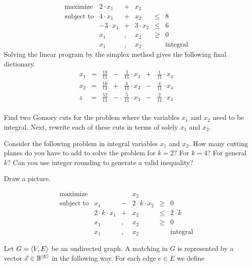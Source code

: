 {\begin{exercise}
\begin{equation}
\begin{array}{rrcrcr}
\mbox{maximize}&2\cdot x_1&+&x_2\\
\mbox{subject to}&4\cdot x_1&+&x_2&\leq&8\\
&-3\cdot x_1&+&3\cdot x_2&\leq&6\\
&x_1&,&x_2&\geq&0\\
&x_1&,&x_2&&\mbox{integral}
\end{array}
\end{equation}
Solving the linear program by the simplex method gives the following final dictionary.
\begin{equation}
\begin{array}{rcrcrcr}
x_1&=&\tfrac{18}{11}&-&\tfrac{3}{11}\cdot x_3&+&\tfrac{1}{11}\cdot x_4\\
x_2&=&\tfrac{16}{11}&+&\tfrac{1}{11}\cdot x_3&-&\tfrac{4}{11}\cdot x_4\\\hline
z&=&\tfrac{52}{11}&-&\tfrac{5}{11}\cdot x_3&-&\tfrac{2}{11}\cdot x_4
\end{array}
\end{equation}
\paragraph{}
Find two Gomory cuts for the problem where the variables $x_1$ and $x_2$ need to be integral. Next, rewrite each of these cuts in terms of solely $x_1$ and $x_2$.
\end{exercise}
\begin{exercise}
Consider the following problem in integral variables $x_1$ and $x_2$. How many cutting planes do you have to add to solve the problem for $k=2$? For $k=4$? For general $k$? Can you use integer rounding to generate a valid inequality?
\begin{hint}
Draw a picture.
\end{hint}
\begin{equation}
\begin{array}{rrcrcr}
\mbox{maximize}&&&x_2\\
\mbox{subject to}&x_1&-&2\cdot k\cdot x_2&\geq&0\\
&2\cdot k\cdot x_1&+&x_2&\leq&2\cdot k\\
&x_1&,&x_2&\geq&0\\
&x_1&,&x_2&&\mbox{integral}
\end{array}
\end{equation}
\end{exercise}
\begin{exercise}
Let $G=\left\langle V,E \right\rangle$ be an undirected graph. A matching in $G$ is represented by a vector $\vec{x}\in\mathbb{B}^{\left| E \right|}$ in the following way. For each edge $e\in E$ we define


\end{exercise}}
